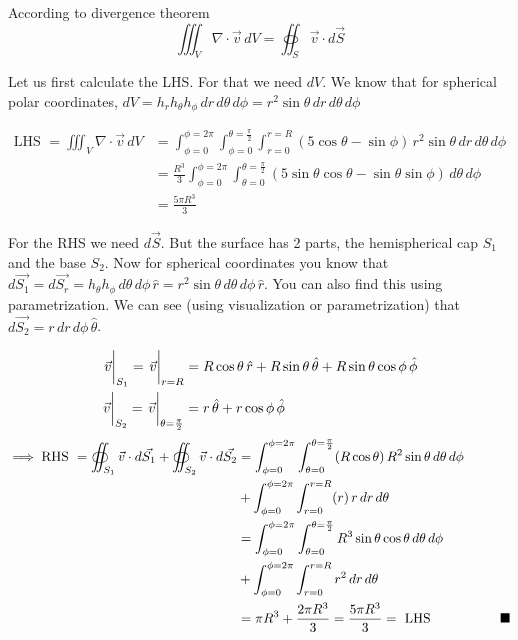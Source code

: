 \documentclass[../main.tex]{subfiles}
\begin{document}
\begin{questions}
\begin{solution}
\begin{center}
	\end{center}

	According to divergence theorem
	\begin{equation}
		\iiint_V \nabla\cdot\vec{v}\,dV = \oiint_S \vec{v}\cdot d\vec{S}
	\end{equation}

	Let us first calculate the LHS. For that we need $dV$. We know that for spherical polar coordinates, $dV = h_r h_\theta h_\phi\,dr\,d\theta\,d\phi = r^2\sin\theta\,dr\,d\theta\,d\phi$

	\begin{align}
		\text{LHS } = \iiint_V \nabla\cdot\vec{v}\,dV &= \int^{\phi=2\pi}_{\phi=0}\int^{\theta=\frac{\pi}{2}}_{\phi=0}\int^{r=R}_{r=0} (5\cos\theta-\sin\phi) \,r^2\sin\theta\,dr\,d\theta\,d\phi \\
		&= \frac{R^3}{3}\int^{\phi=2\pi}_{\phi=0}\int^{\theta=\frac{\pi}{2}}_{\theta=0} (5\sin\theta\cos\theta - \sin\theta\sin\phi)\, d\theta\,d\phi \\
		&= \frac{5\pi R^3}{3}
	\end{align}

	For the RHS we need $d\vec{S}$. But the surface has 2 parts, the hemispherical cap $S_1$ and the base $S_2$. Now for spherical coordinates you know that $d\vec{S_1} = d\vec{S_r} = h_\theta h_\phi \,d\theta\, d\phi\, \hat{r} = r^2\sin\theta\, d\theta\, d\phi\, \hat{r}$. You can also find this using parametrization. We can see (using visualization or parametrization) that $d\vec{S_2} = r\,dr\,d\phi\,\hat{\theta}$.

	\begin{align}
		\eval{\vec{v}}_{S_1} = \eval{\vec{v}}_{r=R} &= R\cos\theta\,\hat{r} + R\sin\theta\,\hat{\theta} + R\sin\theta\cos\phi\,\hat{\phi} \\
		\eval{\vec{v}}_{S_2} = \eval{\vec{v}}_{\theta=\frac{\pi}{2}} &= r\,\hat{\theta} + r\cos\phi\,\hat{\phi}
	\end{align}
	\begin{align}
		\implies \text{RHS } = \oiint_{S_1} \vec{v}\cdot d\vec{S_1} + \oiint_{S_2} \vec{v}\cdot d\vec{S_2}  &= \int^{\phi=2\pi}_{\phi=0}\int^{\theta=\frac{\pi}{2}}_{\theta=0} (R\cos\theta)\,R^2\sin\theta\,d\theta\,d\phi \\
		&+ \int^{\phi=2\pi}_{\phi=0}\int^{r=R}_{r=0} (r)\,r\,dr\,d\theta\\
		&= \int^{\phi=2\pi}_{\phi=0}\int^{\theta=\frac{\pi}{2}}_{\theta=0} R^3\sin\theta\cos\theta\,d\theta\,d\phi \\
		&+ \int^{\phi=2\pi}_{\phi=0}\int^{r=R}_{r=0} r^2\,dr\,d\theta \\
		&= \pi R^3 + \frac{2\pi R^3}{3} = \frac{5\pi R^3}{3} = \text{ LHS} \hskip0.15\textwidth\blacksquare
	\end{align}
\end{solution}


\end{questions}
\end{document}
